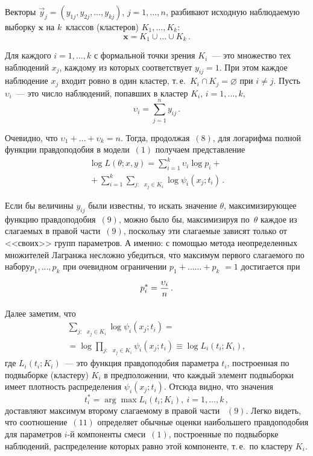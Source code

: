 \begin{multicols}{2}
Векторы $\vec{y}_{j}=(y_{1j}%
,y_{2j},\ldots,y_{kj})$, $j=1,\ldots,n$, разбивают исходную
наблюдаемую выборку $\mathbf{x}$ на $k$~классов (кластеров)
$K_{1},\ldots,K_{k}$:
$$
\mathbf{x}=K_{1}\cup\ldots\cup K_{k}\,.
$$

Для каждого $i=1,\ldots,k$ с формальной точки зрения $K_{i}$~---
это множество тех наблюдений $x_{j}$, каж\-до\-му из которых
соответствует $y_{ij}=1$. При этом каждое наблюдение $x_{j}$
входит ровно в один кластер, т.\,е.\ $K_{i}\cap K_{j}=\varnothing$
при $i\neq j.$ Пусть $\upsilon_{i}$~--- это число наблюдений,
попавших в кластер $K_{i}$, $i=1,\ldots,k$,
$$
\upsilon_{i}=%
\sum\limits_{j=1}^{n}
y_{ij}\,.
$$


Очевидно, что $\upsilon_{1}+\ldots+\upsilon_{k}=n$. Тогда,
продолжая~$(8)$, для логарифма полной функции правдоподобия в
модели~$(1)$ получаем представление
\begin{multline}
\log L(\theta;x,y)=
\sum\limits_{i=1}^{k}
\upsilon_{i}\log p_{i}+{}
\\
{}+
\sum\limits_{i=1}^{k}
\sum\limits_{j:\text{ }x_{j}\in K_{i}}
\log\psi_{i}(x_{j};t_{i})\,.
\end{multline}


Если бы величины $y_{ij}$ были известны, то искать значение
$\theta$, максимизирующее функцию
правдоподобия~$(9)$, можно было бы, максимизируя по~$\theta$ каждое из слагаемых в
правой части~$(9)$, поскольку эти слагаемые зависят только от
<<своих>> групп параметров. А именно: с помощью метода
неопределенных множителей Лагранжа несложно убедиться, что
максимум первого слагаемого по набору\linebreak $p_{1},\ldots,p_{k}$ при
очевидном ограничении $p_{1}+\ldots$\linebreak $\ldots +p_{k}$ $=1$
достигается при
\begin{equation}
p_{i}^{\ast}=\displaystyle\frac{\displaystyle \upsilon_{i}\mathstrut}{\displaystyle n\mathstrut}\,.
\end{equation}


Далее заметим, что
\begin{multline*}
\sum\limits_{j:\text{ }x_{j}\in K_{i}}
\log\psi_{i}(x_{j};t_{i})={}
\\
{}=\log
\prod\limits_{j:\text{ }x_{j}\in K_{i}}
\psi_{i}(x_{j};t_{i})\equiv\log L_{i}(t_{i};K_{i}),
\end{multline*}
где $L_{i}(t_{i};K_{i})$~--- это функция правдоподобия параметра
$t_{i}$, построенная по подвыборке (кластеру) $K_{i}$ в
предположении, что каждый элемент подвыборки имеет плотность
распределения $\psi_{i}(x_{j};t_{i})$. Отсюда видно, что значения
\begin{equation}
t_{i}^{\ast}=\arg\max L_{i}(t_{i};K_{i}),\ i=1,\ldots,k\,,
\end{equation}
доставляют максимум второму слагаемому в правой части ~$(9)$.
Легко видеть, что соотношение~$(11)$ определяет обычные оценки
наибольшего правдоподобия для параметров $i$-й компоненты
смеси~$(1)$, построенные по подвыборке наблюдений, распределение
которых равно этой компоненте, т.\,е.\ по кластеру $K_{i}$.


\end{multicols}
